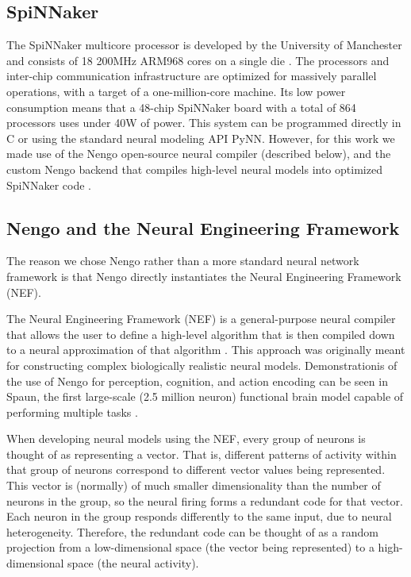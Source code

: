 \documentclass[conference]{IEEEtran}
\begin{document}
\subsection{SpiNNaker}

The SpiNNaker multicore processor is developed by the University of Manchester 
and consists of 18 200MHz ARM968 cores on a single die \cite{furber2007neural, furber2014spinnaker}. 
The processors and inter-chip communication infrastructure are optimized for
massively parallel operations, with a target of a one-million-core machine.  Its
low power consumption means that a 48-chip SpiNNaker board with a total of 
864 processors uses under 40W of power. This system can be programmed directly 
in C or using the standard neural modeling API PyNN. However, for this work
we made use of the Nengo open-source neural compiler \cite{bekolay_nengo2014} 
(described below), and the custom Nengo backend that compiles high-level
neural models into optimized SpiNNaker code \cite{mundy2015}.

\subsection{Nengo and the Neural Engineering Framework}

The reason we chose Nengo rather than a more standard neural network framework is that Nengo \cite{bekolay_nengo2014} directly instantiates the Neural Engineering Framework (NEF). 

The Neural Engineering Framework (NEF) is a general-purpose neural compiler 
that allows the user to define a high-level algorithm that is then compiled 
down to a neural approximation of that algorithm \cite{eliasmith2004neural}. 
This approach was originally meant for constructing complex biologically realistic neural 
models. Demonstrationis of the use of Nengo for perception, cognition, and 
action encoding can be seen in Spaun, the first large-scale 
(2.5 million neuron) functional brain model capable of performing multiple 
tasks  \cite{eliasmith_largescale_2012}. 

When developing neural models using the NEF, every group of neurons is thought
of as representing a vector.  That is, different patterns of activity within
that group of neurons correspond to different vector values being represented.
This vector is (normally) of much smaller dimensionality than the number of 
neurons in the group, so the neural firing forms a redundant code for that 
vector. Each neuron in the group responds differently to the same input, due
to neural heterogeneity. Therefore, the redundant code can be thought of as a 
random projection from a low-dimensional space (the vector being represented) 
to a high-dimensional space (the neural activity). 
\end{document}
